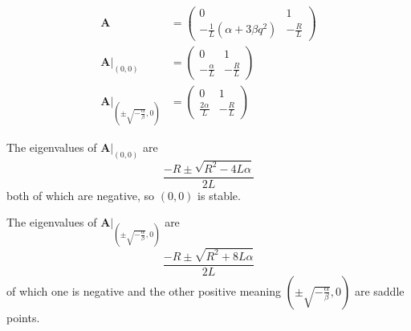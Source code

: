 \documentclass{article}
\begin{document}
\begin{align*}
  \mathbf{A}                                                                     & = \begin{pmatrix}
                                                                                       0                                   & 1            \\
                                                                                       -\frac{1}{L} (\alpha + 3 \beta q^2) & -\frac{R}{L}
                                                                                     \end{pmatrix} \\
  \left. \mathbf{A} \right|_{(0, 0)}                                             & = \begin{pmatrix}
                                                                                       0                 & 1            \\
                                                                                       -\frac{\alpha}{L} & -\frac{R}{L}
                                                                                     \end{pmatrix}                   \\
  \left. \mathbf{A} \right|_{\left( \pm \sqrt{-\frac{\alpha}{\beta}}, 0 \right)} & = \begin{pmatrix}
                                                                                       0                  & 1            \\
                                                                                       \frac{2 \alpha}{L} & -\frac{R}{L}
                                                                                     \end{pmatrix}
\end{align*}

The eigenvalues of $\left. \mathbf{A} \right|_{(0, 0)}$ are \[\frac{-R \pm \sqrt{R^2 - 4 L \alpha}}{2 L}\] both of which are negative, so $(0, 0)$ is stable.

The eigenvalues of $\left. \mathbf{A} \right|_{\left( \pm \sqrt{-\frac{\alpha}{\beta}}, 0 \right)}$ are \[\frac{-R \pm \sqrt{R^2 + 8 L \alpha}}{2 L}\] of which one is negative and the other positive meaning $\left(\pm \sqrt{-\frac{\alpha}{\beta}}, 0 \right)$ are saddle points.

\setcounter{subsubsection}{38}
\subsubsection{}
\end{document}
